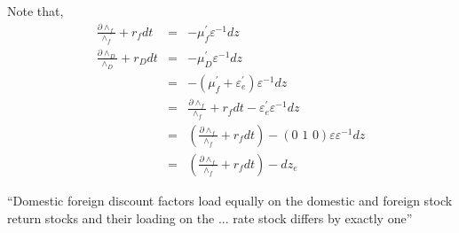 \documentclass[]{article}
\begin{document}
Note that,
\begin{eqnarray*}
\frac{\partial \wedge_f}{\wedge_f} + r_f dt &=& -\mu_f^\prime \varepsilon^{-1} dz\\
\frac{\partial \wedge_D}{\wedge_D} + r_D dt &=& -\mu_D^\prime \varepsilon^{-1} dz\\
&=& -(\mu_f^\prime + \varepsilon_e^\prime) \varepsilon^{-1} dz\\
&=& \frac{\partial \wedge_f}{\wedge_f} + r_fdt - \varepsilon_e^\prime \varepsilon^{-1} dz\\
&=& \left(\frac{\partial \wedge_f}{\wedge_f}+r_fdt\right)-\left(\mbox{0 1 0}\right)\varepsilon \varepsilon^{-1} dz\\
&=& \left(\frac{\partial \wedge_f}{\wedge_f} + r_f dt\right) - dz_e
\end{eqnarray*}

``Domestic foreign discount factors load equally on the domestic and foreign stock return stocks and their loading on the ... rate stock differs by exactly one''
\end{document}
